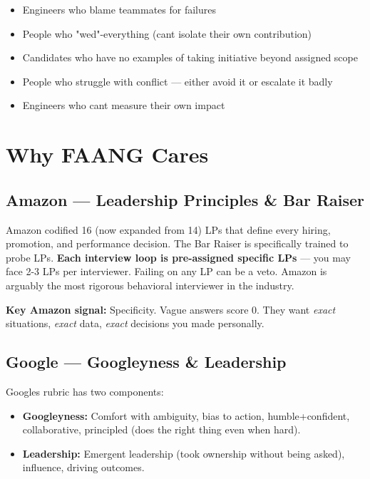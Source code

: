 \documentclass[11pt]{article}
\providecommand{\tightlist}{\setlength{\itemsep}{1pt}\setlength{\parskip}{0pt}}
\begin{document}
\begin{itemize}
\tightlist
\item
  Engineers who blame teammates for failures
\item
  People who "we\textquotesingle d"-everything (can\textquotesingle t isolate their own contribution)
\item
  Candidates who have no examples of taking initiative beyond assigned scope
\item
  People who struggle with conflict --- either avoid it or escalate it badly
\item
  Engineers who can\textquotesingle t measure their own impact
\end{itemize}

\section{Why FAANG Cares}\label{why-faang-cares}

\subsection{Amazon --- Leadership Principles \& Bar Raiser}\label{amazon--leadership-principles--bar-raiser}

Amazon codified 16 (now expanded from 14) LPs that define every hiring, promotion, and performance decision. The Bar Raiser is specifically trained to probe LPs. \textbf{Each interview loop is pre-assigned specific LPs} --- you may face 2-3 LPs per interviewer. Failing on any LP can be a veto. Amazon is arguably the most rigorous behavioral interviewer in the industry.

\textbf{Key Amazon signal:} Specificity. Vague answers score 0. They want \emph{exact} situations, \emph{exact} data, \emph{exact} decisions you made personally.

\subsection{Google --- Googleyness \& Leadership}\label{google--googleyness--leadership}

Google\textquotesingle s rubric has two components:

\begin{itemize}
\tightlist
\item
  \textbf{Googleyness:} Comfort with ambiguity, bias to action, humble+confident, collaborative, principled (does the right thing even when hard).
\item
  \textbf{Leadership:} Emergent leadership (took ownership without being asked), influence, driving outcomes.
\end{itemize}
\end{document}
